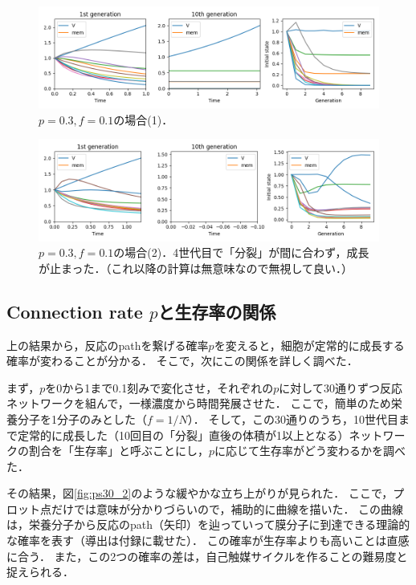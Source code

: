 \documentclass[a4paper,11pt]{jsarticle}
\begin{document}
\begin{figure}[htbp]
  \centering
  \includegraphics[width=\columnwidth]{rand_03_01_1.png}
  \caption{$p=0.3,f=0.1$の場合(1)．}
  \label{fig:rand_03_01_1}
\end{figure}
\begin{figure}[htbp]
  \centering
  \includegraphics[width=\columnwidth]{rand_03_01_2.png}
  \caption{$p=0.3,f=0.1$の場合(2)．4世代目で「分裂」が間に合わず，成長が止まった．（これ以降の計算は無意味なので無視して良い．）}
  \label{fig:rand_03_01_2}
\end{figure}

\subsection{Connection rate $p$と生存率の関係}
上の結果から，反応のpathを繋げる確率$p$を変えると，細胞が定常的に成長する確率が変わることが分かる．
そこで，次にこの関係を詳しく調べた．

まず，$p$を0から1まで0.1刻みで変化させ，それぞれの$p$に対して30通りずつ反応ネットワークを組んで，一様濃度から時間発展させた．
ここで，簡単のため栄養分子を1分子のみとした（$f=1/N$）．
そして，この30通りのうち，10世代目まで定常的に成長した（10回目の「分裂」直後の体積が1以上となる）ネットワークの割合を「生存率」と呼ぶことにし，$p$に応じて生存率がどう変わるかを調べた．

その結果，図\ref{fig:ps30_2}のような緩やかな立ち上がりが見られた．
ここで，プロット点だけでは意味が分かりづらいので，補助的に曲線を描いた．
この曲線は，栄養分子から反応のpath（矢印）を辿っていって膜分子に到達できる理論的な確率を表す（導出は付録に載せた）．
この確率が生存率よりも高いことは直感に合う．
また，この2つの確率の差は，自己触媒サイクルを作ることの難易度と捉えられる．
\end{document}
